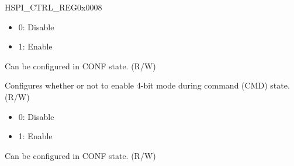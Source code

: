 \begin{register}{H}{SPI\_CTRL\_REG}{0x0008}
\begin{regdesc}
\begin{reglist}
\begin{itemize}
    \item 0: Disable
    \item 1: Enable
\end{itemize}  
Can be configured in CONF state. (R/W)
\label{fielddesc:SPIFCMDQUAD}\item [SPI\_FCMD\_QUAD] Configures whether or not to enable 4-bit mode during command (CMD) state. (R/W)\\
\begin{itemize}
    \item 0: Disable
    \item 1: Enable
\end{itemize} 
Can be configured in CONF state. (R/W)
\item [Continued on the next page...]
\end{reglist}\end{regdesc}
\end{register}

